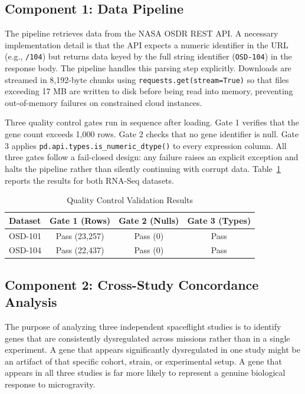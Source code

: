 \documentclass[conference]{IEEEtran}
\begin{document}
\subsection{Component 1: Data Pipeline}
The pipeline retrieves data from the NASA OSDR REST API. A necessary implementation detail is that the API expects a numeric identifier in the URL (e.g., \texttt{/104}) but returns data keyed by the full string identifier (\texttt{OSD-104}) in the response body. The pipeline handles this parsing step explicitly. Downloads are streamed in 8,192-byte chunks using \texttt{requests.get(stream=True)} so that files exceeding 17 MB are written to disk before being read into memory, preventing out-of-memory failures on constrained cloud instances.

Three quality control gates run in sequence after loading. Gate 1 verifies that the gene count exceeds 1,000 rows. Gate 2 checks that no gene identifier is null. Gate 3 applies \texttt{pd.api.types.is\_numeric\_dtype()} to every expression column. All three gates follow a fail-closed design: any failure raises an explicit exception and halts the pipeline rather than silently continuing with corrupt data. Table~\ref{tab:qc} reports the results for both RNA-Seq datasets.

\begin{table}[!t]
\centering
\caption{Quality Control Validation Results}
\label{tab:qc}
\begin{tabular}{lccc}
\toprule
\textbf{Dataset} & \textbf{Gate 1 (Rows)} & \textbf{Gate 2 (Nulls)} & \textbf{Gate 3 (Types)} \\
\midrule
OSD-101 & Pass (23,257) & Pass (0) & Pass \\
OSD-104 & Pass (22,437) & Pass (0) & Pass \\
\bottomrule
\end{tabular}
\end{table}

\subsection{Component 2: Cross-Study Concordance Analysis}
The purpose of analyzing three independent spaceflight studies is to identify genes that are consistently dysregulated across missions rather than in a single experiment. A gene that appears significantly dysregulated in one study might be an artifact of that specific cohort, strain, or experimental setup. A gene that appears in all three studies is far more likely to represent a genuine biological response to microgravity.
\end{document}

